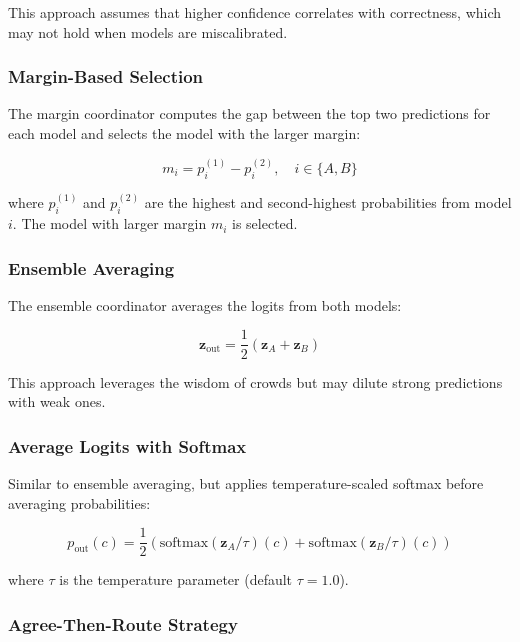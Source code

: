 \documentclass[12pt]{article}
\begin{document}
This approach assumes that higher confidence correlates with correctness, which may not hold when models are miscalibrated.

\subsubsection{Margin-Based Selection}

The margin coordinator computes the gap between the top two predictions for each model and selects the model with the larger margin:

\begin{equation}
m_i = p_i^{(1)} - p_i^{(2)}, \quad i \in \{A, B\}
\end{equation}

where $p_i^{(1)}$ and $p_i^{(2)}$ are the highest and second-highest probabilities from model $i$. The model with larger margin $m_i$ is selected.

\subsubsection{Ensemble Averaging}

The ensemble coordinator averages the logits from both models:

\begin{equation}
\mathbf{z}_{\text{out}} = \frac{1}{2}(\mathbf{z}_A + \mathbf{z}_B)
\end{equation}

This approach leverages the wisdom of crowds but may dilute strong predictions with weak ones.

\subsubsection{Average Logits with Softmax}

Similar to ensemble averaging, but applies temperature-scaled softmax before averaging probabilities:

\begin{equation}
p_{\text{out}}(c) = \frac{1}{2}\left(\text{softmax}(\mathbf{z}_A / \tau)(c) + \text{softmax}(\mathbf{z}_B / \tau)(c)\right)
\end{equation}

where $\tau$ is the temperature parameter (default $\tau=1.0$).

\subsubsection{Agree-Then-Route Strategy}
\end{document}
